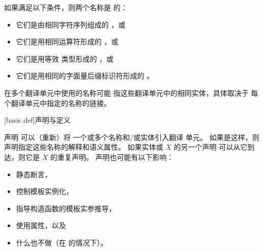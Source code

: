 \pnum
如果满足以下条件，则两个名称是  的：
\begin{itemize}
\item 它们是由相同字符序列组成的 ，或
\item 它们是用相同运算符形成的 ，或
\item 它们是用等效 类型形成的 ，或
\item 它们是用相同的字面量后缀标识符形成的 。
\end{itemize}

\pnum
{}%
%
在多个翻译单元中使用的名称可能
指这些翻译单元中的相同实体，具体取决于
每个翻译单元中指定的名称的链接。

[basic.def]{声明与定义}

\pnum
{}%
%
%
声明 可以（重新）将
一个或多个名称和/或实体引入翻译
单元。
如果是这样，则
声明指定这些名称的解释和语义属性。
如果实体或  $X$ 的另一个声明
可以从它到达，则它是 $X$ 的重复声明。
声明也可能有以下影响：
\begin{itemize}
\item 静态断言，
\item 控制模板实例化，
\item 指导构造函数的模板实参推导，
\item 使用属性，以及
\item 什么也不做（在  的情况下）。
\end{itemize}

